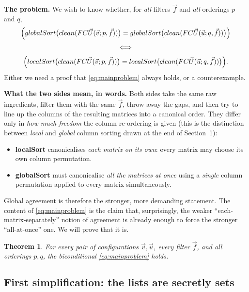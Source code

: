 \documentclass{article}
\newtheorem{theorem}{Theorem}[section]
\begin{document}
\medskip
\noindent\textbf{The problem.}
We wish to know whether, for \emph{all} filters $\vec f$ and \emph{all} orderings
$p$ and $q$,
\begin{gather}
\Bigl(
globalSort\bigl(clean(FC\vec U(\vec v;p,\vec f))\bigr)
=
globalSort\bigl(clean(FC\vec U(\vec u;q,\vec f))\bigr)
\Bigr)
\nonumber\\[2pt]
\iff
\label{eq:mainproblem}\\[2pt]
\Bigl(
localSort\bigl(clean(FC\vec U(\vec v;p,\vec f))\bigr)
=
localSort\bigl(clean(FC\vec U(\vec u;q,\vec f))\bigr)
\Bigr).
\nonumber
\end{gather}
Either we need a proof that \eqref{eq:mainproblem} always holds, or a counterexample.

\medskip
\noindent\textbf{What the two sides mean, in words.}
Both sides take the same raw ingredients, filter them with the same $\vec f$,
throw away the gaps, and then try to line up the columns of the resulting
matrices into a canonical order.  They differ only in \emph{how much freedom} the
column re-ordering is given (this is the distinction between \emph{local} and
\emph{global} column sorting drawn at the end of Section~1):
\begin{itemize}
  \item \textbf{localSort} canonicalises \emph{each matrix on its own}: every
        matrix may choose its own column permutation.
  \item \textbf{globalSort} must canonicalise \emph{all the matrices at once}
        using a \emph{single} column permutation applied to every matrix
        simultaneously.
\end{itemize}
Global agreement is therefore the stronger, more demanding statement.  The
content of \eqref{eq:mainproblem} is the claim that, surprisingly, the weaker
``each-matrix-separately'' notion of agreement is already enough to force the
stronger ``all-at-once'' one.  We will prove that it is.

\begin{theorem}\label{thm:main}
For every pair of configurations $\vec v,\vec u$, every filter $\vec f$, and all
orderings $p,q$, the biconditional \eqref{eq:mainproblem} holds.
\end{theorem}

\subsection*{First simplification: the lists are secretly sets}
\end{document}

